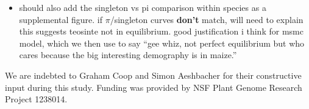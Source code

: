 \documentclass{pnastwo}
\begin{document}
\begin{article}
\begin{materials}
\begin{itemize}
 \item should also add the singleton vs pi comparison within species as a supplemental figure. if $\pi$/singleton curves {\bf don't} match, will need to explain this suggests teosinte not in equilibrium.  good justification i think for msmc model, which we then use to say ``gee whiz, not perfect equilibrium but who cares because the big interesting demography is in maize.''
 
 
 \end{itemize}
\color{black}

\end{materials}

\begin{acknowledgments}
We are indebted to Graham Coop and Simon Aeshbacher for their constructive input during this study. Funding was provided by NSF Plant Genome Research Project 1238014.
\end{acknowledgments}




\onecolumn
 


\end{article}
\end{document}
